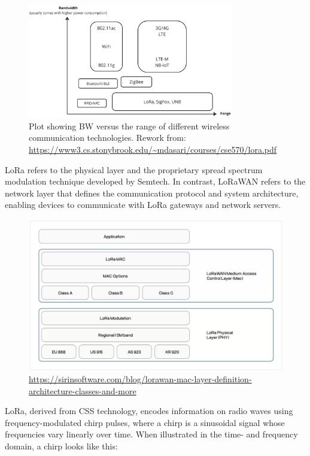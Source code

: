 \begin{figure}[H]
    \centering
    \includegraphics[width=0.8\textwidth]{figures/range_bandwidth.png}
    \caption{Plot showing BW versus the range of different wireless communication technologies. Rework from: \url{https://www3.cs.stonybrook.edu/~mdasari/courses/cse570/lora.pdf}}
    \label{fig:LoRa_bandwidth_range}
\end{figure}

\ac{LoRa} refers to the physical layer and the proprietary spread spectrum modulation technique developed by Semtech. In contrast, \ac{LoRaWAN} refers to the network layer that defines the communication protocol and system architecture, enabling devices to communicate with \ac{LoRa} gateways and network servers. 

\begin{figure}[H]
    \centering
    \includegraphics[width=0.8\linewidth]{figures/image.png}
    \caption{\url{https://sirinsoftware.com/blog/lorawan-mac-layer-definition-architecture-classes-and-more}}
    \label{fig:enter-label}
\end{figure}

LoRa, derived from \ac{CSS} technology, encodes information on radio waves using frequency-modulated chirp pulses, where a chirp is a sinusoidal signal whose frequencies vary linearly over time. When illustrated in the time- and frequency domain, a chirp looks like this:

